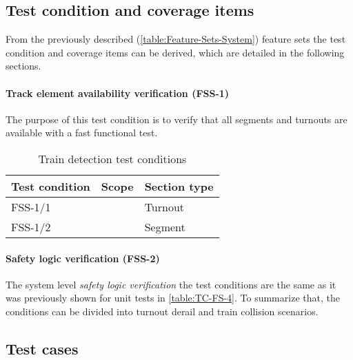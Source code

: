 \subsection{Test condition and coverage items}
From the previously described (\ref{table:Feature-Sets-System}) feature sets the test condition and coverage items can be derived, which are detailed in the following sections.
\paragraph{Track element availability verification (FSS-1)} The purpose of this test condition is to verify that all segments and turnouts are available with a fast functional test. 
\begin{table}[H]
	\caption{Train detection test conditions}
	\label{table:TC-FSS-1}
	\begin{center}
		\renewcommand{\arraystretch}{1.8}
		\begin{tabu} 
			to 0.9 \textwidth
			{  X[c] X[c] X[c] }
			\toprule
			Test condition & Scope                      & Section type \\ \midrule
			FSS-1/1        &  & Turnout      \\
			FSS-1/2        &                            & Segment      \\ \bottomrule
		\end{tabu}
	\end{center}
\end{table}
\paragraph{Safety logic verification (FSS-2)} The system level \textit{safety logic verification} the test conditions are the same as it was previously shown for unit tests in \autoref{table:TC-FS-4}. To summarize that, the conditions can be divided into turnout derail and train collision scenarios.

\subsection{Test cases}
